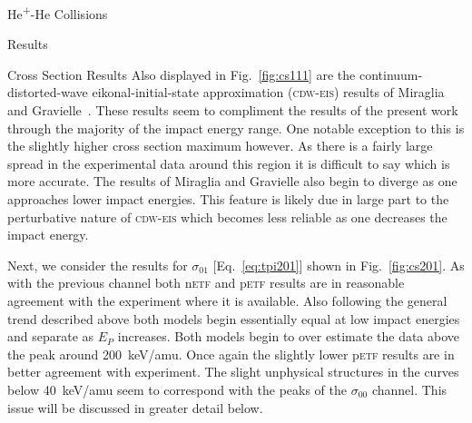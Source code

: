 \documentclass[letterpaper, 11 pt]{report}
\begin{document}
\begin{chapter}{\texorpdfstring{He\textsuperscript{+}}{He+}-He Collisions \label{chap:hephe}}
\begin{section}{Results \label{sec:hephe-disc}}
\begin{subsection}{Cross Section Results \label{sec:hephe-res}}
         Also displayed in Fig.~\ref{fig:cs111} are the continuum-distorted-wave eikonal-initial-state
         approximation (\textsc{cdw-eis}) results of Miraglia and Gravielle~\cite{MG-10}. These results
         seem to compliment the results of the present work through the majority of the impact energy
         range. One notable exception to this is the slightly higher cross section maximum however. As
         there is a fairly large spread in the experimental data around this region it is difficult to
         say which is more accurate. The results of Miraglia and Gravielle also begin to diverge as one
         approaches lower impact energies. This feature is likely due in large part to the perturbative
         nature of \textsc{cdw-eis} which becomes less reliable as one decreases the impact energy.

         Next, we consider the results for $\sigma_{01}$ [Eq.~\eqref{eq:tpi201}] shown in
         Fig.~\ref{fig:cs201}. As with the previous channel both n\textsc{etf} and p\textsc{etf} results
         are in reasonable agreement with the experiment where it is available. Also following the
         general trend described above both models begin essentially equal at low impact energies and
         separate as $E_P$ increases. Both models begin to over estimate the data above the peak around
         200~keV/amu. Once again the slightly lower p\textsc{etf} results are in better agreement with
         experiment. The slight unphysical structures in the curves below 40~keV/amu seem to correspond
         with the peaks of the $\sigma_{00}$ channel. This issue will be discussed in greater detail
         below.


\end{subsection}
\end{section}
\end{chapter}
\end{document}
